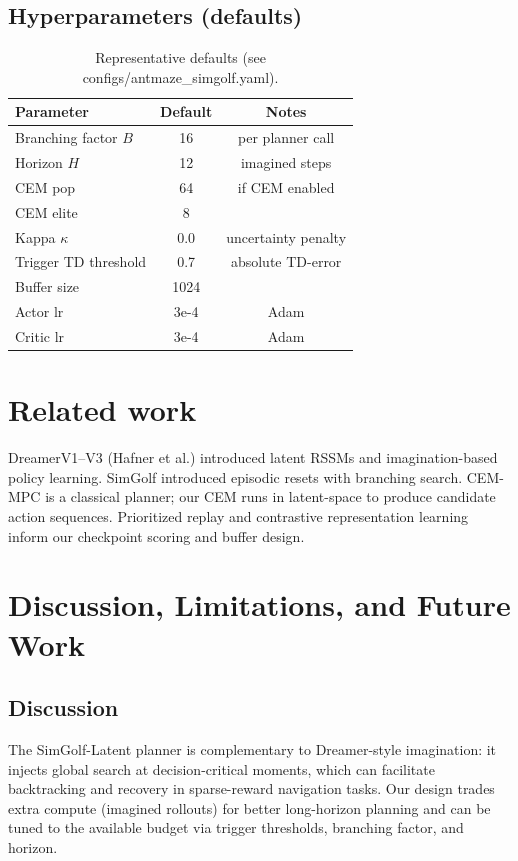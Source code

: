 \documentclass{article}
\begin{document}
\subsection{Hyperparameters (defaults)}
\begin{table}[ht]
\centering
\begin{tabular}{lcc}
\toprule
Parameter & Default & Notes \\
\midrule
Branching factor \(B\) & 16 & per planner call \\
Horizon \(H\) & 12 & imagined steps \\
CEM pop & 64 & if CEM enabled \\
CEM elite & 8 & \\
Kappa \(\kappa\) & 0.0 & uncertainty penalty \\
Trigger TD threshold & 0.7 & absolute TD-error \\
Buffer size & 1024 & \\
Actor lr & 3e-4 & Adam \\
Critic lr & 3e-4 & Adam \\
\bottomrule
\end{tabular}
\caption{Representative defaults (see configs/antmaze_simgolf.yaml).}
\end{table}

\section{Related work}
DreamerV1--V3 (Hafner et al.) introduced latent RSSMs and imagination-based policy
learning. SimGolf introduced episodic resets with branching search. CEM-MPC is a
classical planner; our CEM runs in latent-space to produce candidate action
sequences. Prioritized replay and contrastive representation learning inform our
checkpoint scoring and buffer design.

\section{Discussion, Limitations, and Future Work}
\subsection{Discussion}
The SimGolf-Latent planner is complementary to Dreamer-style imagination: it
injects global search at decision-critical moments, which can facilitate
backtracking and recovery in sparse-reward navigation tasks. Our design trades
extra compute (imagined rollouts) for better long-horizon planning and can be
tuned to the available budget via trigger thresholds, branching factor, and
horizon.
\end{document}
